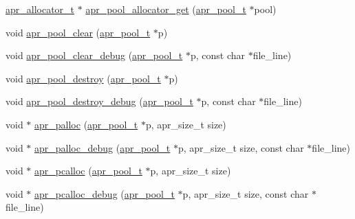 \begin{DoxyCompactItemize}
\item 
\hyperlink{group__apr__allocator_ga1ceabfd30fcfc455e47d052d2a24244b}{apr\+\_\+allocator\+\_\+t} $\ast$ \hyperlink{group__apr__pools_gaf446fcf5da1fcd62d3f802a4c0c10f97}{apr\+\_\+pool\+\_\+allocator\+\_\+get} (\hyperlink{group__apr__pools_gaf137f28edcf9a086cd6bc36c20d7cdfb}{apr\+\_\+pool\+\_\+t} $\ast$pool)
\item 
void \hyperlink{group__apr__pools_gafa8a998cd660e82b62aecec09e239d0d}{apr\+\_\+pool\+\_\+clear} (\hyperlink{group__apr__pools_gaf137f28edcf9a086cd6bc36c20d7cdfb}{apr\+\_\+pool\+\_\+t} $\ast$p)
\item 
void \hyperlink{group__apr__pools_ga9521870e42ec4395a0bf8388706a57b9}{apr\+\_\+pool\+\_\+clear\+\_\+debug} (\hyperlink{group__apr__pools_gaf137f28edcf9a086cd6bc36c20d7cdfb}{apr\+\_\+pool\+\_\+t} $\ast$p, const char $\ast$file\+\_\+line)
\item 
void \hyperlink{group__apr__pools_ga54759954d2cba7cb649ab5680a33f9e3}{apr\+\_\+pool\+\_\+destroy} (\hyperlink{group__apr__pools_gaf137f28edcf9a086cd6bc36c20d7cdfb}{apr\+\_\+pool\+\_\+t} $\ast$p)
\item 
void \hyperlink{group__apr__pools_ga7efe64dfcce883d7fad9df813d9259fc}{apr\+\_\+pool\+\_\+destroy\+\_\+debug} (\hyperlink{group__apr__pools_gaf137f28edcf9a086cd6bc36c20d7cdfb}{apr\+\_\+pool\+\_\+t} $\ast$p, const char $\ast$file\+\_\+line)
\item 
void $\ast$ \hyperlink{group__apr__pools_ga85f1e193c31d109affda72f9a92c6915}{apr\+\_\+palloc} (\hyperlink{group__apr__pools_gaf137f28edcf9a086cd6bc36c20d7cdfb}{apr\+\_\+pool\+\_\+t} $\ast$p, apr\+\_\+size\+\_\+t size)
\item 
void $\ast$ \hyperlink{group__apr__pools_ga0ac211ac89be868b107776b4183a8174}{apr\+\_\+palloc\+\_\+debug} (\hyperlink{group__apr__pools_gaf137f28edcf9a086cd6bc36c20d7cdfb}{apr\+\_\+pool\+\_\+t} $\ast$p, apr\+\_\+size\+\_\+t size, const char $\ast$file\+\_\+line)
\item 
void $\ast$ \hyperlink{group__apr__pools_gaf61c098ad258069d64cdf8c0a9369f9e}{apr\+\_\+pcalloc} (\hyperlink{group__apr__pools_gaf137f28edcf9a086cd6bc36c20d7cdfb}{apr\+\_\+pool\+\_\+t} $\ast$p, apr\+\_\+size\+\_\+t size)
\item 
void $\ast$ \hyperlink{group__apr__pools_ga7b43035318ffdc57a6eddab07dc57cb2}{apr\+\_\+pcalloc\+\_\+debug} (\hyperlink{group__apr__pools_gaf137f28edcf9a086cd6bc36c20d7cdfb}{apr\+\_\+pool\+\_\+t} $\ast$p, apr\+\_\+size\+\_\+t size, const char $\ast$file\+\_\+line)
\item 

\end{DoxyCompactItemize}
